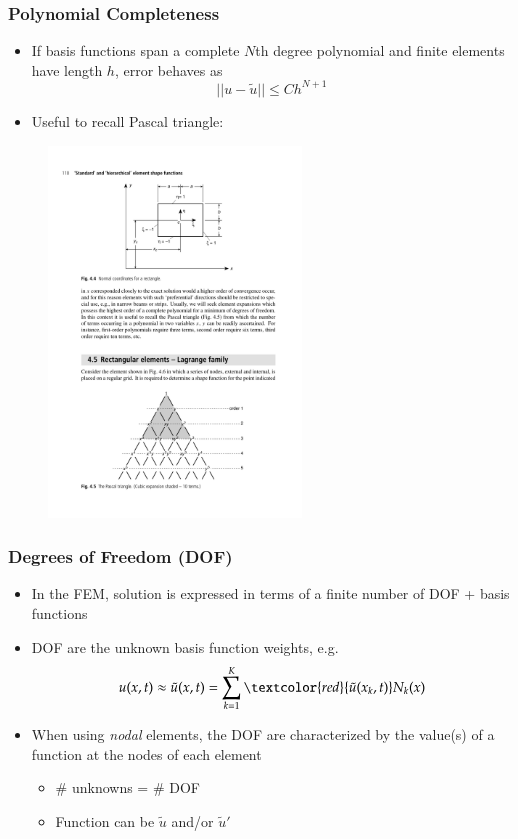 \documentclass[serif,12pt]{beamer}
\begin{document}
\begin{frame}
\frametitle{Polynomial Completeness}
\begin{itemize}
\item If basis functions span a complete $N$th degree polynomial and finite elements have length $h$, error behaves as
	\[||u-\tilde{u}|| \leq Ch^{N+1}\]
\item Useful to recall Pascal triangle:
\end{itemize}
\begin{figure}
    \includegraphics[width=0.6\textwidth]{figures/bookFig2.pdf}
    \let\thefootnote\relax{}
\end{figure}
\end{frame}

\begin{frame}
\frametitle{Degrees of Freedom (DOF)}
\begin{itemize}
	\item In the FEM, solution is expressed in terms of a finite number of DOF + basis functions
	\item DOF are the unknown basis function weights, e.g.
\[u(x,t) \approx \tilde{u}(x,t) = \displaystyle\sum_{k=1}^{K}\textcolor{red}{\tilde{u}(x_k,t)}N_k(x) \]
	\item When using \emph{nodal} elements, the DOF are characterized by the value(s) of a function at the nodes of each element
	\begin{itemize}
		\item \# unknowns = \# DOF
		\item Function can be $\tilde{u}$ and/or $\tilde{u}'$
	\end{itemize}
\end{itemize}
\end{frame}
\end{document}
